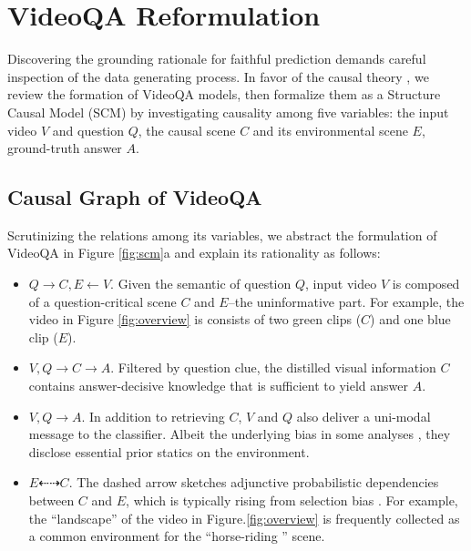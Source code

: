 \section{VideoQA Reformulation}
\label{sec:reformulation}

Discovering the grounding rationale for faithful prediction demands careful inspection of the data generating process. In favor of the causal theory \cite{pearl2016causal}, we review the formation of VideoQA models, then formalize them as a Structure Causal Model (SCM) \cite{alma991011292629705181}  by investigating causality among five variables: the input video $V$ and question $Q$, the causal scene $C$ and its environmental scene $E$, ground-truth answer $A$.

\subsection{Causal Graph of VideoQA}
Scrutinizing the relations among its variables, we abstract the formulation of VideoQA in Figure \ref{fig:scm}a and explain its rationality as follows:

\begin{itemize}[leftmargin=*]
    \item $Q\to C, E \gets V$. Given the semantic of question $Q$,  input video $V$ is composed of a question-critical scene $C$ and $E$--the uninformative part. For example, the video in Figure \ref{fig:overview} is consists of two green clips (\ie $C$) and one blue clip (\ie $E$).
    
    \item $V,Q\to C\to A$. Filtered by question clue, the distilled visual information $C$ contains answer-decisive knowledge that is sufficient to yield answer $A$.
    
    \item $V,Q\to A$. In addition to retrieving $C$, $V$ and $Q$ also deliver a uni-modal message to the classifier. Albeit the underlying bias in some analyses \cite{cadene2019rubi,niu2020counterfactual}, they disclose essential prior statics on the environment. 
    
    \item $E\dashleftarrow\dashrightarrow C$. The dashed arrow sketches adjunctive probabilistic dependencies \cite{reason:Pearl09a} between $C$ and $E$, which is typically rising from selection bias \cite{DBLP:conf/cvpr/TorralbaE11}. For example, the ``landscape'' of the video in Figure.\ref{fig:overview} is frequently collected as a common environment for the ``horse-riding '' scene. 
    
\end{itemize}
